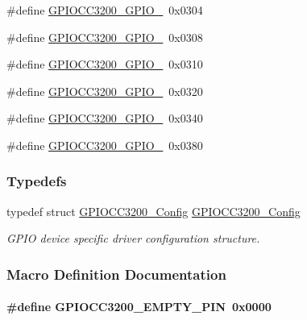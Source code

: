 \begin{DoxyCompactItemize}
\item 
\#define \hyperlink{_g_p_i_o_c_c3200_8h_a2a643d3e640feaddd2d01f13f963c450}{G\+P\+I\+O\+C\+C3200\+\_\+\+G\+P\+I\+O\+\_}~0x0304
\item 
\#define \hyperlink{_g_p_i_o_c_c3200_8h_ac8e9bbf6ba31c048c3f8d0d3b4c4c3d1}{G\+P\+I\+O\+C\+C3200\+\_\+\+G\+P\+I\+O\+\_}~0x0308
\item 
\#define \hyperlink{_g_p_i_o_c_c3200_8h_a78fbc8892e9e311dbf141a49208ac71f}{G\+P\+I\+O\+C\+C3200\+\_\+\+G\+P\+I\+O\+\_}~0x0310
\item 
\#define \hyperlink{_g_p_i_o_c_c3200_8h_a9417bbe7bb745aae0a0381df084b0192}{G\+P\+I\+O\+C\+C3200\+\_\+\+G\+P\+I\+O\+\_}~0x0320
\item 
\#define \hyperlink{_g_p_i_o_c_c3200_8h_aa18235b477bdeb7a8d0f50418c3cee43}{G\+P\+I\+O\+C\+C3200\+\_\+\+G\+P\+I\+O\+\_}~0x0340
\item 
\#define \hyperlink{_g_p_i_o_c_c3200_8h_a94b80d5b24dc2feb1fadeae6c5e4a701}{G\+P\+I\+O\+C\+C3200\+\_\+\+G\+P\+I\+O\+\_}~0x0380
\end{DoxyCompactItemize}
\subsubsection*{Typedefs}
\begin{DoxyCompactItemize}
\item 
typedef struct \hyperlink{struct_g_p_i_o_c_c3200___config}{G\+P\+I\+O\+C\+C3200\+\_\+\+Config} \hyperlink{_g_p_i_o_c_c3200_8h_a83397cd7214bc18a324928587f638415}{G\+P\+I\+O\+C\+C3200\+\_\+\+Config}
\begin{DoxyCompactList}\small\item\em G\+P\+I\+O device specific driver configuration structure. \end{DoxyCompactList}\end{DoxyCompactItemize}


\subsubsection{Macro Definition Documentation}
\paragraph[{G\+P\+I\+O\+C\+C3200\+\_\+\+E\+M\+P\+T\+Y\+\_\+\+P\+I\+N}]{\setlength{\rightskip}{0pt plus 5cm}\#define G\+P\+I\+O\+C\+C3200\+\_\+\+E\+M\+P\+T\+Y\+\_\+\+P\+I\+N~0x0000}\label{_g_p_i_o_c_c3200_8h_a5e7e582daec7fc79e7ef88bd015c7a6c}


